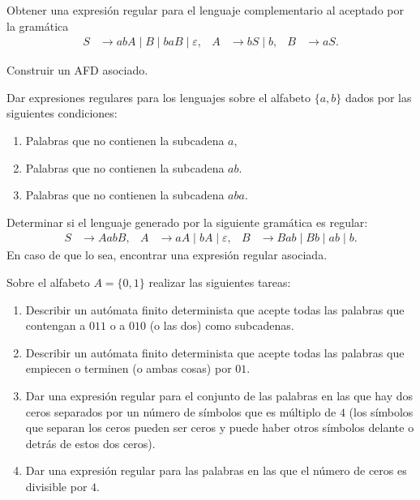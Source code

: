 \begin{ejercicio}
    Obtener una expresión regular para el lenguaje complementario al aceptado por la gramática
    \begin{align*}
        S &\to abA \mid B \mid baB \mid \varepsilon, & A &\to bS \mid b, & B &\to aS.
    \end{align*}
    \begin{observacion}
        Construir un AFD asociado.
    \end{observacion}
\end{ejercicio}

\begin{ejercicio} \label{ej:1.2.12}
    Dar expresiones regulares para los lenguajes sobre el alfabeto $\{a, b\}$ dados por las siguientes condiciones:
    \begin{enumerate}
        \item Palabras que no contienen la subcadena $a$,
        \item Palabras que no contienen la subcadena $ab$.
        \item Palabras que no contienen la subcadena $aba$.
    \end{enumerate}
\end{ejercicio}

\begin{ejercicio}
    Determinar si el lenguaje generado por la siguiente gramática es regular:
    \begin{align*}
        S &\to AabB, & A &\to aA \mid bA \mid \varepsilon, & B &\to Bab \mid Bb \mid ab \mid b.
    \end{align*}
    En caso de que lo sea, encontrar una expresión regular asociada.
\end{ejercicio}

\begin{ejercicio}
    Sobre el alfabeto $A = \{0, 1\}$ realizar las siguientes tareas:
    \begin{enumerate}
        \item Describir un autómata finito determinista que acepte todas las palabras que contengan a $011$ o a $010$ (o las dos) como subcadenas.
        \item Describir un autómata finito determinista que acepte todas las palabras que empiecen o terminen (o ambas cosas) por $01$.
        \item Dar una expresión regular para el conjunto de las palabras en las que hay dos ceros separados por un número de símbolos que es múltiplo de $4$ (los símbolos que separan los ceros pueden ser ceros y puede haber otros símbolos delante o detrás de estos dos ceros).
        \item Dar una expresión regular para las palabras en las que el número de ceros es divisible por $4$.
    \end{enumerate}
\end{ejercicio}

